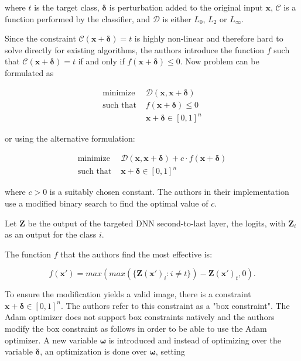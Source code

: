 where $t$ is the target class, $\pmb \delta$ is perturbation added to the original input $\pmb x$, $\mathcal{C}$ is a function performed by the classifier, and $\mathcal{D}$ is either $L_0$, $L_2$ or $L_\infty$. 

Since the constraint $\mathcal{C} (\pmb x + \pmb \delta) = t$ is highly non-linear and therefore hard to solve directly for existing algorithms, the authors introduce the function $f$ such that  $\mathcal{C} (\pmb x + \pmb \delta) = t$ if and only if $f(\pmb x + \pmb \delta) \leq 0$. Now problem can be formulated as

\begin{align*}
\text{minimize  } & \mathcal{D}(\pmb x, \pmb x + \pmb \delta) \\
\text{such that }& f(\pmb x + \pmb \delta) \leq 0 \\
                  & \pmb x + \pmb \delta \in [0, 1]^n
\end{align*}

or using the alternative formulation: 

\begin{align*}
\text{minimize  }& \mathcal{D}(\pmb x, \pmb x + \pmb \delta) + c \cdot f(\pmb x+\pmb \delta) \\
\text{such that }& \pmb x + \pmb \delta \in [0, 1]^n
\end{align*}

where $c > 0$ is a suitably chosen constant. The authors in their implementation use a modified binary search to find the optimal value of $c$. 

Let $\pmb Z$ be the output of the targeted DNN second-to-last layer, the logits,  with $\pmb Z_i$ as an output for the class $i$.

The function $f$ that the authors find the most effective is: 

\begin{equation}
f(\pmb x') = max(max(\{\pmb Z(\pmb x ')_i : i \neq t\}) - \pmb Z(\pmb x')_t, 0).
\label{fun:obj-fun}
\end{equation}

To ensure the modification yields a valid image, there is a constraint  $\pmb x + \pmb \delta \in [0, 1]^n$. The authors refer to this constraint as a "box constraint". The Adam \cite{DBLP:journals/corr/KingmaB14} optimizer does not support box constraints  natively and the authors modify the box constraint as follows in order to be able to use the Adam optimizer. A new variable $\pmb \omega$ is introduced and instead of optimizing over the variable $\pmb \delta$, an optimization is done over $\pmb \omega$, setting 


